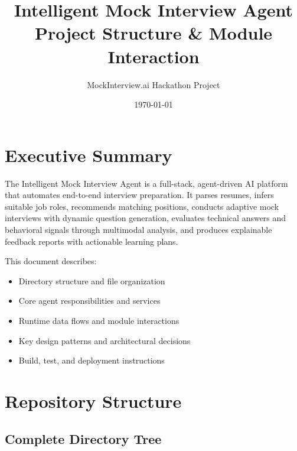 \documentclass[11pt]{article}
\title{\textbf{Intelligent Mock Interview Agent}\\Project Structure \& Module Interaction}
\author{MockInterview.ai Hackathon Project}
\date{\today}
\begin{document}
\maketitle

\tableofcontents
\newpage

\section{Executive Summary}

The Intelligent Mock Interview Agent is a full-stack, agent-driven AI platform that automates end-to-end interview preparation. It parses resumes, infers suitable job roles, recommends matching positions, conducts adaptive mock interviews with dynamic question generation, evaluates technical answers and behavioral signals through multimodal analysis, and produces explainable feedback reports with actionable learning plans.

This document describes:
\begin{itemize}
  \item Directory structure and file organization
  \item Core agent responsibilities and services
  \item Runtime data flows and module interactions
  \item Key design patterns and architectural decisions
  \item Build, test, and deployment instructions
\end{itemize}

\newpage

\section{Repository Structure}

\subsection{Complete Directory Tree}
\end{document}
